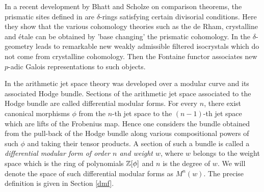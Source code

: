 \documentclass{amsart}
\numberwithin{equation}{section}
\def \d{\delta}
\begin{document}
In a recent development by Bhatt and Scholze on comparison theorems, the 
prismatic sites defined in \cite{bhatt2019prisms} are $\d$-rings satisfying 
certain 
divisorial conditions. Here they show that the various cohomology
theories such as the de Rham, crystalline and \'{e}tale can be obtained by
'base changing' the prismatic cohomology.
In \cite{drin,isocrys} the $\d$-geometry leads to remarkable
 new weakly admissible filtered isocrystals which do not come from crystalline 
cohomology. Then the Fontaine functor associates  new 
$p$-adic Galois representations to such objects.

In \cite{MR1908022, MR1748272, MR2025806, MR2081150, 
MR2882615,  MR2890522, MR2890519} 
the arithmetic jet space theory was developed over a modular
curve and its associated Hodge bundle. Sections of the arithmetic jet space 
associated to the Hodge bundle are called differential modular forms. 
For every $n$, there exist canonical morphisms $\phi$ 
from the $n$-th jet space to 
the $(n-1)$-th jet space which are lifts of the Frobenius map.
Hence one considers the bundle obtained
from the pull-back of 
the Hodge bundle along various compositional powers of such $\phi$ and taking
their tensor products.  
A section of such a bundle is called a {\it differential modular form of order 
$n$ and weight $w$}, where $w$ belongs to the weight space which is the 
ring of polynomials $\mathbb{Z}[\phi]$ and $n$
is the degree of $w$. We will denote the space of such differential
modular forms as $M^n(w)$. The precise definition is given in Section 
\ref{dmf}.
\end{document}
